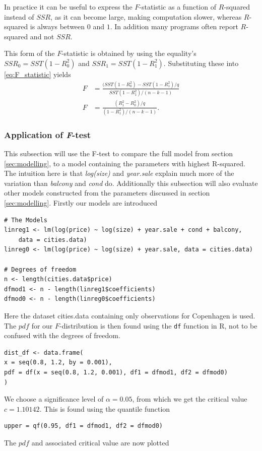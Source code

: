 In practice it can be useful to express the $F$-statistic as a function of $R$-squared instead of $SSR$, as it can become large, making computation slower, whereas $R$-squared is always between $0$ and $1$. In addition many programs often report $R$-squared and not $SSR$.

This form of the $F$-statistic is obtained by using the equality's $SSR_0 = SST(1 - R^2_0)$ and $SSR_1 = SST(1-R^2_1)$. Substituting these into \eqref{eq:F_statistic} yields
\begin{align}\label{eq:F_test_R}
    F &= \frac{(SST(1 - R^2_0) - SST(1-R^2_1)/q}{SST(1-R^2_1)/(n-k-1)} \nonumber \\
    F &= \frac{(R^2_1 - R^2_0)/q}{(1 - R^2_1)/(n-k-1)}.
\end{align}


\subsubsection{Application of \textit{F}-test}\label{sec:app_F_test}
This subsection will use the F-test to compare the full model from section \ref{sec:modelling}, to a model containing the parameters with highest R-squared. 
The intuition here is that \textit{log(size)} and \textit{year.sale} explain much more of the variation than \textit{balcony} and \textit{cond} do.
Additionally this subsection will also evaluate other models constructed from the parameters discussed in section \ref{sec:modelling}.
Firstly our models are introduced
\begin{lstlisting}
# The Models
linreg1 <- lm(log(price) ~ log(size) + year.sale + cond + balcony, 
    data = cities.data)
linreg0 <- lm(log(price) ~ log(size) + year.sale, data = cities.data)
    
# Degrees of freedom
n <- length(cities.data$price)
dfmod1 <- n - length(linreg1$coefficients)
dfmod0 <- n - length(linreg0$coefficients)
\end{lstlisting}
Here the dataset cities.data containing only observations for Copenhagen is used.
The $pdf$ for our $F$-distribution is then found using the \texttt{df} function in R, not to be confused with the degrees of freedom. 
\begin{lstlisting}
dist_df <- data.frame(
x = seq(0.8, 1.2, by = 0.001),
pdf = df(x = seq(0.8, 1.2, 0.001), df1 = dfmod1, df2 = dfmod0)
)
\end{lstlisting}
We choose a significance level of $\alpha = 0.05$, from which we get the critical value $c=1.10142$. 
This is found using the quantile function
\begin{lstlisting}
upper = qf(0.95, df1 = dfmod1, df2 = dfmod0)
\end{lstlisting}
The $pdf$ and associated critical value are now plotted
    
